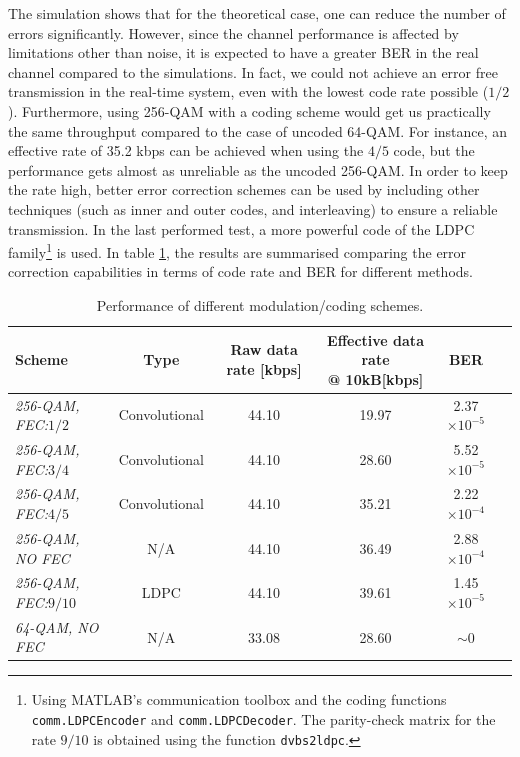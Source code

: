 \documentclass[12pt,a4paper,openright]{report}
\begin{document}
The simulation shows that for the theoretical case, one can reduce the number of errors significantly. However, since the channel performance is affected by limitations other than noise, it is expected to have a greater BER in the real channel compared to the simulations. In fact, we could not achieve an error free transmission in the real-time system, even with the lowest code rate possible ($1/2 $). Furthermore, using 256-QAM with a coding scheme would get us practically the same throughput compared to the case of uncoded 64-QAM. For instance, an effective rate of 35.2 kbps can be achieved when using the $4/5$ code, but  the performance gets almost as unreliable as the uncoded 256-QAM. In order to  keep the rate high, better error correction schemes can be used by including other techniques (such as inner and outer codes, and interleaving) to ensure a reliable transmission. In the last performed test, a more powerful code of the LDPC family\footnote{Using MATLAB's communication toolbox and the coding functions \texttt{comm.LDPCEncoder} and \texttt{comm.LDPCDecoder}. The parity-check matrix for the rate $9/10$ is obtained using the function \texttt{dvbs2ldpc}.} is used. In table \ref{table:Rates}, the results are summarised comparing the error correction capabilities in terms of code rate and BER for different methods.

\begin{table} [h]
\centering
\begin{tabular}{lccccl} 
\hline
\bf{Scheme} 				& \bf Type       & \bf{Raw data rate}\textnormal{ [kbps]}    & \shortstack{\bf{Effective data rate}\\ \bf{@ 10kB}\textnormal{[kbps]}} &  \bf{BER} \\
\hline
\emph{256-QAM, FEC:$1/2$}   & Convolutional    & 44.10           			 & 19.97        & 2.37$\times 10^{-5}$    \\
\emph{256-QAM, FEC:$3/4$}   & Convolutional    & 44.10        		         & 28.60        & 5.52$\times 10^{-5}$    \\
\emph{256-QAM, FEC:$4/5$}   & Convolutional    & 44.10      			     & 35.21        & 2.22$\times 10^{-4}$    \\
\emph{256-QAM, NO FEC}      & N/A              & 44.10       			     & 36.49        & 2.88$\times 10^{-4}$    \\
\emph{256-QAM, FEC:$9/10$}  & LDPC             & 44.10     			         & 39.61        & 1.45$\times 10^{-5}$    \\
\hline
\emph{64-QAM, NO FEC}       & N/A              & 33.08            			 & 28.60        & $\sim 0$  			  \\
\hline
\end{tabular}
\caption[Performance of different modulation/coding schemes]{Performance of different modulation/coding schemes.}
\label{table:Rates}
\end{table}
\end{document}
